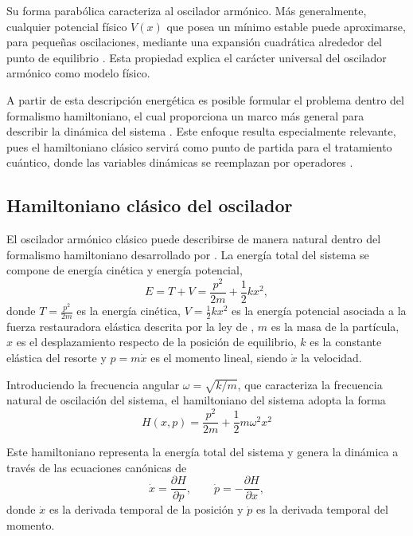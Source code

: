 Su forma parabólica caracteriza al oscilador armónico. Más generalmente, cualquier potencial físico $V(x)$ que posea un mínimo estable puede aproximarse, para pequeñas oscilaciones, mediante una expansión cuadrática alrededor del punto de equilibrio \citep{hamilton1834, schrodinger1926a}. Esta propiedad explica el carácter universal del oscilador armónico como modelo físico.

A partir de esta descripción energética es posible formular el problema dentro del formalismo hamiltoniano, el cual proporciona un marco más general para describir la dinámica del sistema \citep{hamilton1834}. Este enfoque resulta especialmente relevante, pues el hamiltoniano clásico servirá como punto de partida para el tratamiento cuántico, donde las variables dinámicas se reemplazan por operadores \citep{dirac1930}.


\subsection{Hamiltoniano clásico del oscilador}
El oscilador armónico clásico puede describirse de manera natural dentro del formalismo hamiltoniano desarrollado por \cite{hamilton1834}. 
La energía total del sistema se compone de energía cinética y energía potencial,
\vspace{-10pt}
\begin{equation}
	E = T + V = \frac{p^2}{2m} + \frac{1}{2}k x^2,
\end{equation} donde $T = \frac{p^2}{2m}$ es la energía cinética, $V = \frac{1}{2}kx^2$ es la energía potencial asociada a la fuerza restauradora elástica descrita por la ley de \cite{hooke1678}, $m$ es la masa de la partícula, $x$ es el desplazamiento respecto de la posición de equilibrio, $k$ es la constante elástica del resorte y $p = m\dot{x}$ es el momento lineal, siendo $\dot{x}$ la velocidad.

Introduciendo la frecuencia angular $\omega = \sqrt{k/m}$, que caracteriza la frecuencia natural de oscilación del sistema,
el hamiltoniano del sistema adopta la forma
\vspace{-10pt}
\begin{equation}
	H(x,p) = \frac{p^2}{2m} + \frac{1}{2}m\omega^2 x^2
\end{equation}

Este hamiltoniano representa la energía total del sistema y genera la dinámica a través de las ecuaciones canónicas de \cite{hamilton1834}
\vspace{-10pt}
\begin{equation}
	\dot{x} = \frac{\partial H}{\partial p}, 
	\qquad
	\dot{p} = -\frac{\partial H}{\partial x},
\end{equation} donde $\dot{x}$ es la derivada temporal de la posición y $\dot{p}$ es la derivada temporal del momento.

